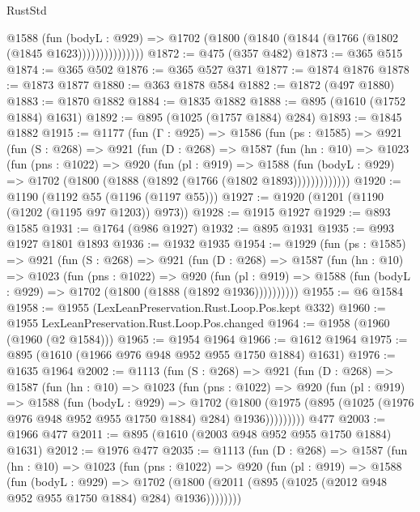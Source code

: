 \begin{lexlean}{RustStd}
\begin{coremodule}
                  @1588
                    (fun (bodyL : @929) =>
                    @1702 (@1800 (@1840 (@1844 (@1766 (@1802 (@1845 @1623)))))))))))))))
@1872 := @475 (@357 @482)
@1873 := @365 @515
@1874 := @365 @502
@1876 := @365 @527 @371
@1877 := @1874 @1876
@1878 := @1873 @1877
@1880 := @363 @1878 @584
@1882 := @1872 (@497 @1880)
@1883 := @1870 @1882
@1884 := @1835 @1882
@1888 := @895 (@1610 (@1752 @1884) @1631)
@1892 := @895 (@1025 (@1757 @1884) @284)
@1893 := @1845 @1882
@1915 := @1177
    (fun (Γ : @925) =>
    @1586
      (fun (ps : @1585) =>
      @921
        (fun (S : @268) =>
        @921
          (fun (D : @268) =>
          @1587
            (fun (hn : @10) =>
            @1023
              (fun (pns : @1022) =>
              @920
                (fun (pl : @919) =>
                @1588
                  (fun (bodyL : @929) => @1702 (@1800 (@1888 (@1892 (@1766 (@1802 @1893)))))))))))))
@1920 := @1190 (@1192 @55 (@1196 (@1197 @55)))
@1927 := @1920 (@1201 (@1190 (@1202 (@1195 @97 @1203)) @973))
@1928 := @1915 @1927
@1929 := @893 @1585
@1931 := @1764 (@986 @1927)
@1932 := @895 @1931
@1935 := @993 @1927 @1801 @1893
@1936 := @1932 @1935
@1954 := @1929
    (fun (ps : @1585) =>
    @921
      (fun (S : @268) =>
      @921
        (fun (D : @268) =>
        @1587
          (fun (hn : @10) =>
          @1023
            (fun (pns : @1022) =>
            @920
              (fun (pl : @919) =>
              @1588 (fun (bodyL : @929) => @1702 (@1800 (@1888 (@1892 @1936))))))))))
@1955 := @6 @1584
@1958 := @1955 (LexLeanPreservation.Rust.Loop.Pos.kept @332)
@1960 := @1955 LexLeanPreservation.Rust.Loop.Pos.changed
@1964 := @1958 (@1960 (@1960 (@2 @1584)))
@1965 := @1954 @1964
@1966 := @1612 @1964
@1975 := @895 (@1610 (@1966 @976 @948 @952 @955 @1750 @1884) @1631)
@1976 := @1635 @1964
@2002 := @1113
    (fun (S : @268) =>
    @921
      (fun (D : @268) =>
      @1587
        (fun (hn : @10) =>
        @1023
          (fun (pns : @1022) =>
          @920
            (fun (pl : @919) =>
            @1588
              (fun (bodyL : @929) =>
              @1702
                (@1800
                  (@1975 (@895 (@1025 (@1976 @976 @948 @952 @955 @1750 @1884) @284) @1936)))))))))
    @477
@2003 := @1966 @477
@2011 := @895 (@1610 (@2003 @948 @952 @955 @1750 @1884) @1631)
@2012 := @1976 @477
@2035 := @1113
    (fun (D : @268) =>
    @1587
      (fun (hn : @10) =>
      @1023
        (fun (pns : @1022) =>
        @920
          (fun (pl : @919) =>
          @1588
            (fun (bodyL : @929) =>
            @1702 (@1800 (@2011 (@895 (@1025 (@2012 @948 @952 @955 @1750 @1884) @284) @1936))))))))

\end{coremodule}
\end{lexlean}
